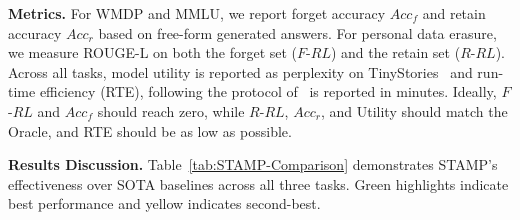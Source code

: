 \medskip
\noindent
\textbf{Metrics.}
For WMDP and MMLU, we report forget accuracy $Acc_f$ and retain accuracy $Acc_r$ based on free-form generated answers. For personal data erasure, we measure ROUGE-L on both the forget set ($F$-$RL$) and the retain set ($R$-$RL$). Across all tasks, model utility is reported as perplexity on TinyStories~\citeauthor{eldan2023tinystories} and run-time efficiency (RTE), following the protocol of~\citeauthor{huang2025unified} is reported in minutes. Ideally, $F$-$RL$ and $Acc_f$ should reach zero, while $R$-$RL$, $Acc_r$, and Utility should match the Oracle, and RTE should be as low as possible.

\medskip
\noindent
\textbf{Results Discussion.}
Table~\ref{tab:STAMP-Comparison} demonstrates STAMP's effectiveness over SOTA baselines across all three tasks. \colorbox{green!30}{Green} highlights indicate best performance and \colorbox{yellow!40}{yellow} indicates second-best.

